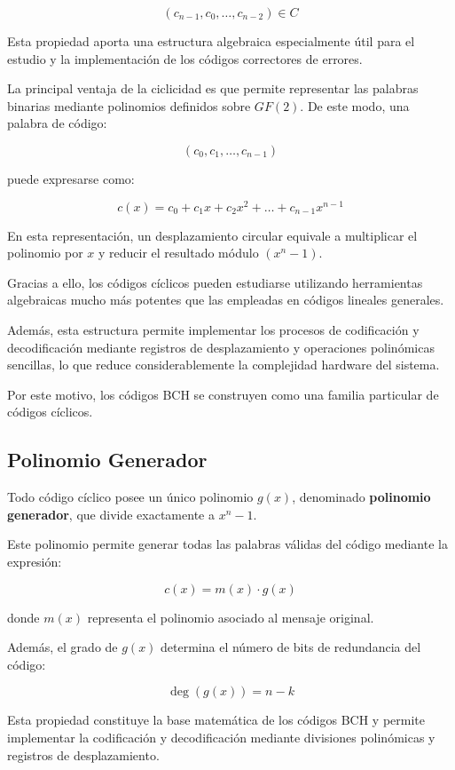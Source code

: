 $$
(c_{n-1},c_0,\dots,c_{n-2}) \in C
$$

Esta propiedad aporta una estructura algebraica especialmente útil para el estudio y la implementación de los códigos correctores de errores.

La principal ventaja de la ciclicidad es que permite representar las palabras binarias mediante polinomios definidos sobre $GF(2)$. De este modo, una palabra de código:

$$
(c_0,c_1,\dots,c_{n-1})
$$

puede expresarse como:

$$
c(x)=c_0+c_1x+c_2x^2+\dots+c_{n-1}x^{n-1}
$$

En esta representación, un desplazamiento circular equivale a multiplicar el polinomio por $x$ y reducir el resultado módulo $(x^n-1)$.

Gracias a ello, los códigos cíclicos pueden estudiarse utilizando herramientas algebraicas mucho más potentes que las empleadas en códigos lineales generales.

Además, esta estructura permite implementar los procesos de codificación y decodificación mediante registros de desplazamiento y operaciones polinómicas sencillas, lo que reduce considerablemente la complejidad hardware del sistema.

Por este motivo, los códigos BCH se construyen como una familia particular de códigos cíclicos.

\subsection{Polinomio Generador}
\label{subsec:polinomio_generador}

Todo código cíclico posee un único polinomio $g(x)$, denominado \textbf{polinomio generador}, que divide exactamente a $x^n-1$.

Este polinomio permite generar todas las palabras válidas del código mediante la expresión:

$$
c(x)=m(x)\cdot g(x)
$$

donde $m(x)$ representa el polinomio asociado al mensaje original.

Además, el grado de $g(x)$ determina el número de bits de redundancia del código:

$$
\deg(g(x)) = n-k
$$

Esta propiedad constituye la base matemática de los códigos BCH y permite implementar la codificación y decodificación mediante divisiones polinómicas y registros de desplazamiento.


